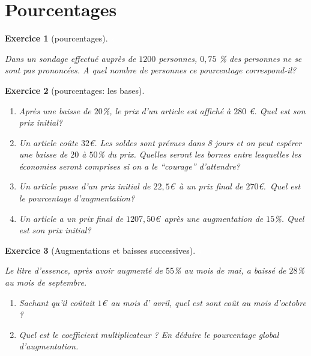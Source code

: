 \documentclass [10pt,a4paper] {article}
\def\ben{\begin{enumerate}}
\def\een{\end{enumerate}}
\newtheorem{exo}{Exercice}
\begin{document}
\vspace{0.25cm}


\section{Pourcentages}

\begin{exo}[pourcentages]

\textcolor{white}{s}

Dans un sondage effectué auprès de $1 200$ personnes, $0,75$ \% des personnes
ne se sont pas prononcées. 
A quel nombre de personnes ce pourcentage correspond-il?
\end{exo}
\vspace{0.25cm}


\begin{exo}[pourcentages: les bases]

\textcolor{white}{s}
\ben
\item Après une baisse de $20$\%, le prix d'un article est affiché à $280$ \euro. Quel est
son prix initial?
\item  Un article coûte $32$\euro. Les soldes sont prévues dans 8 jours et on peut
espérer une baisse de $20$ à $50$\% du prix. Quelles seront les bornes entre lesquelles les économies seront comprises si on a le ``courage'' d’attendre?
\item  Un article passe d’un prix initial de $22,5$\euro \ à un prix final de $270$\euro.\ Quel est
le pourcentage d’augmentation?
\item Un article a un prix final de $1207,50$\euro \ après une augmentation de $15$\%.
Quel est son prix initial?
\een
\end{exo}
\vspace{0.25cm}


\begin{exo}[Augmentations et baisses successives]

\textcolor{white}{s}

Le litre d’essence, après avoir augmenté de $55$\% au mois de mai, a baissé de $28$\% au mois de septembre.
\ben
\item Sachant qu’il coûtait $1$\euro\ au mois d' avril, quel est sont coût au mois d'octobre ?
\item  Quel est le coefficient multiplicateur ? En déduire le pourcentage global
d’augmentation.
\een
\end{exo}
\vspace{0.25cm}
\end{document}
